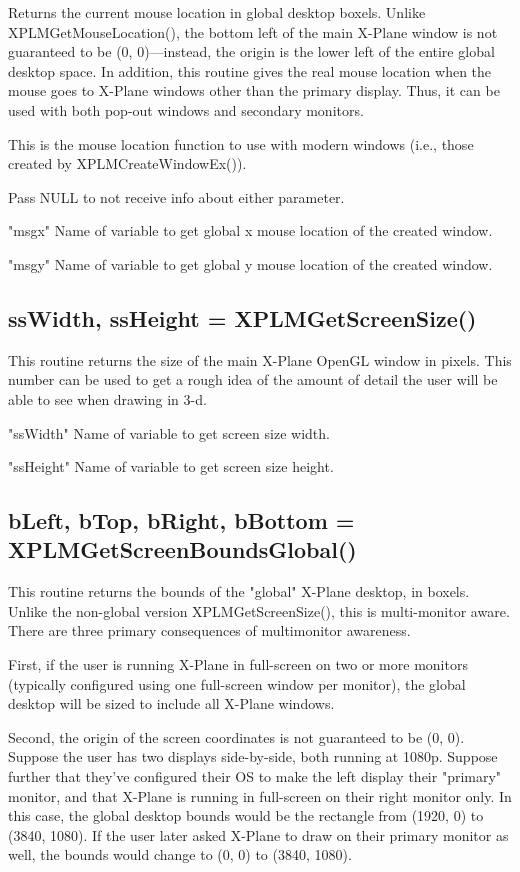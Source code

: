 \documentclass[11pt,parskip=half,a4paper]{scrartcl}
\begin{document}
Returns the current mouse location in global desktop boxels. Unlike XPLMGetMouseLocation(), the bottom left of the main X-Plane window is not guaranteed to be (0, 0)---instead, the origin is the lower left of the entire global desktop space. In addition, this routine gives the real mouse location when the mouse goes to X-Plane windows other than the primary display. Thus, it can be used with both pop-out windows and secondary monitors.

This is the mouse location function to use with modern windows (i.e., those created by XPLMCreateWindowEx()).

Pass NULL to not receive info about either parameter.

"msgx" Name of variable to get global x mouse location of the created window.

"msgy" Name of variable to get global y mouse location of the created window.

\subsection{\hspace*{1.0mm}ssWidth, ssHeight = XPLMGetScreenSize()}

This routine returns the size of the main X-Plane OpenGL window in pixels. This number can be used to get a rough idea of the amount of detail the user will be able to see when drawing in 3-d.

"ssWidth" Name of variable to get screen size width.

"ssHeight" Name of variable to get screen size height.

\newpage

\subsection{\hspace*{1.0mm}bLeft, bTop, bRight, bBottom = XPLMGetScreenBoundsGlobal()}

This routine returns the bounds of the "global" X-Plane desktop, in boxels. Unlike the non-global version XPLMGetScreenSize(), this is multi-monitor aware. There are three primary consequences of multimonitor awareness.

First, if the user is running X-Plane in full-screen on two or more monitors (typically configured using one full-screen window per monitor), the global desktop will be sized to include all X-Plane windows.

Second, the origin of the screen coordinates is not guaranteed to be (0, 0). Suppose the user has two displays side-by-side, both running at 1080p. Suppose further that they've configured their OS to make the left display their "primary" monitor, and that X-Plane is running in full-screen on their right monitor only. In this case, the global desktop bounds would be the rectangle from (1920, 0) to (3840, 1080). If the user later asked X-Plane to draw on their primary monitor as well, the bounds would change to (0, 0) to (3840, 1080).
\end{document}
